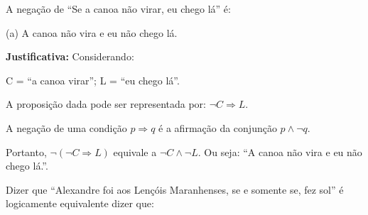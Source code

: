 \documentclass[12pt,letterpaper, onecolumn]{exam}
\begin{document}
\begin{questions}
\begin{solution}
    \end{solution}
    
    \question[q10] A negação de “Se a canoa não virar, eu chego lá” é: 
    

    \begin{solution}
        (a) A canoa não vira e eu não chego lá.

        \textbf{Justificativa:} Considerando:

            C = “a canoa virar”; \hfill
            L = “eu chego lá”. 

            A proposição dada pode ser representada por: \( \neg C \Rightarrow L \).

            A negação de uma condição \( p \Rightarrow q \) é a afirmação da conjunção \( p \wedge \neg q \).

            Portanto, \( \neg ( \neg C \Rightarrow L ) \) equivale a \( \neg C \wedge \neg L \). Ou seja:  “A canoa não vira e eu não chego lá.”.
        
        \end{solution}
    
    \question[q11] Dizer que “Alexandre foi aos Lençóis Maranhenses, se e somente se, fez sol” é logicamente equivalente dizer que: 
    
\end{questions}
\end{document}

